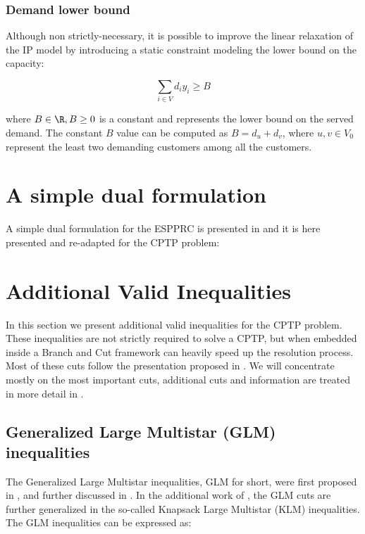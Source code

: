 \subsubsection{Demand lower bound}
Although non strictly-necessary, it is possible to improve the linear relaxation of the IP model by introducing a static constraint modeling the lower bound on the capacity:

\begin{equation}\label{eq:resource-lower-bound-constraint}
	\sum_{i \in V} d_i y_i   \ge B
\end{equation}

where $B \in \R, B \ge 0$ is a constant and represents the lower bound on the served demand.
The constant $B$ value can be computed as $B = d_u + d_v$, where $u, v \in V_0$ represent the least two demanding customers among all the customers.

\section{A simple dual formulation}

A simple dual formulation for the ESPPRC is presented in \cite{beasley1989algorithm} and it is here presented and re-adapted for the CPTP problem:



\section{Additional Valid Inequalities}

In this section we present additional valid inequalities for the CPTP problem.
These inequalities are not strictly required to solve a CPTP, but when embedded inside a Branch and Cut framework can heavily speed up the resolution process.
Most of these cuts follow the presentation proposed in \cite{Jepsen2014}.
We will concentrate mostly on the most important cuts, additional cuts and information are treated in more detail in \cite{Jepsen2014}.

\subsection{Generalized Large Multistar (GLM) inequalities}
The Generalized Large Multistar inequalities, GLM for short, were first proposed in \cite{gouveia_result_1995}, and further discussed in \cite{letchford2006projection}.
In the additional work of \cite{letchford_multistars_2002}, the GLM cuts are further generalized in the so-called Knapsack Large Multistar (KLM) inequalities.
The GLM inequalities can be expressed as:


